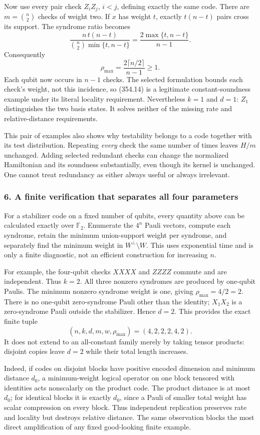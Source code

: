 \documentclass[11pt]{article}
\begin{document}
Now use every pair check $Z_iZ_j$, $i<j$, defining exactly the same code. There are $m=\binom n2$ checks of weight two. If $x$ has weight $t$, exactly $t(n-t)$ pairs cross its support. The syndrome ratio becomes
\[
 \frac{n\,t(n-t)}{\binom n2\min\{t,n-t\}}
       =\frac{2\max\{t,n-t\}}{n-1}.
\]
Consequently
\[
 \rho_{\max}=\frac{2\lceil n/2\rceil}{n-1}\ge1.
 \tag{354.14}
\]
Each qubit now occurs in $n-1$ checks. The selected formulation bounds each check's weight, not this incidence, so (354.14) is a legitimate constant-soundness example under its literal locality requirement. Nevertheless $k=1$ and $d=1$: $Z_1$ distinguishes the two basis states. It solves neither of the missing rate and relative-distance requirements.

This pair of examples also shows why testability belongs to a code together with its test distribution. Repeating \emph{every} check the same number of times leaves $H/m$ unchanged. Adding selected redundant checks can change the normalized Hamiltonian and its soundness substantially, even though its kernel is unchanged. One cannot treat redundancy as either always useful or always irrelevant.

\subsubsection{6. A finite verification that separates all four parameters}
For a stabilizer code on a fixed number of qubits, every quantity above can be calculated exactly over $\mathbb F_2$. Enumerate the $4^n$ Pauli vectors, compute each syndrome, retain the minimum union-support weight per syndrome, and separately find the minimum weight in $W^\perp\setminus W$. This uses exponential time and is only a finite diagnostic, not an efficient construction for increasing $n$.

For example, the four-qubit checks $XXXX$ and $ZZZZ$ commute and are independent. Thus $k=2$. All three nonzero syndromes are produced by one-qubit Paulis. The minimum nonzero syndrome weight is one, giving $\rho_{\max}=4/2=2$. There is no one-qubit zero-syndrome Pauli other than the identity; $X_1X_2$ is a zero-syndrome Pauli outside the stabilizer. Hence $d=2$. This provides the exact finite tuple
\[
 (n,k,d,m,w,\rho_{\max})=(4,2,2,2,4,2).
\]
It does not extend to an all-constant family merely by taking tensor products: disjoint copies leave $d=2$ while their total length increases.

Indeed, if codes on disjoint blocks have positive encoded dimension and minimum distance $d_0$, a minimum-weight logical operator on one block tensored with identities acts nonscalarly on the product code. The product distance is at most $d_0$; for identical blocks it is exactly $d_0$, since a Pauli of smaller total weight has scalar compression on every block. Thus independent replication preserves rate and locality but destroys relative distance. The same observation blocks the most direct amplification of any fixed good-looking finite example.
\end{document}

